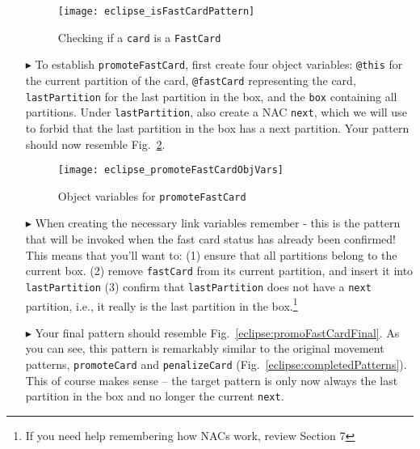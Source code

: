 \begin{itemize}
\begin{figure}[htp]
\begin{center}
  \texttt{[image: eclipse\_isFastCardPattern]}
  \caption{Checking if a \texttt{card} is a \texttt{FastCard}}
  \label{eclipse:isFastCardPattern}
\end{center}
\end{figure}

\newpage

\item[$\blacktriangleright$] To establish \texttt{promoteFastCard}, first create four object variables: \texttt{@this} for the
current partition of the card, \texttt{@fastCard} representing the card, \texttt{lastPartition} for the last partition in the box, and the \texttt{box}
containing all partitions. Under \texttt{lastPartition}, also create a NAC \texttt{next}, which we will use to forbid that the last partition in the box has a
next partition.
Your pattern should now resemble Fig.~\ref{eclipse:objVarFastCard}.

\vspace{0.5cm}

\begin{figure}[htp]
\begin{center}
  \texttt{[image: eclipse\_promoteFastCardObjVars]}
  \caption{Object variables for \texttt{promoteFastCard}}
  \label{eclipse:objVarFastCard}
\end{center}
\end{figure}

\item[$\blacktriangleright$] When creating the necessary link variables remember - this is the pattern that will be invoked when the fast card status has
already been confirmed! This means that you'll want to:
(1) ensure that all partitions belong to the current box.
(2) remove \texttt{fastCard} from its current partition, and insert it into \texttt{lastPartition}
(3) confirm that \texttt{lastPartition} does not have a \texttt{next} partition, i.e., it really is the last partition in the box.\footnote{If you need help
remembering how NACs work, review Section 7}

\item[$\blacktriangleright$] Your final pattern should resemble Fig.~\ref{eclipse:promoFastCardFinal}. As you can see, this pattern is remarkably similar to the
original movement patterns, \texttt{pro\-mote\-Card} and \texttt{pen\-a\-lize\-Card} (Fig.~\ref{eclipse:completedPatterns}). This of course makes sense -- the
target pattern is only now always the last partition in the box and no longer the current \texttt{next}.


\end{itemize}
